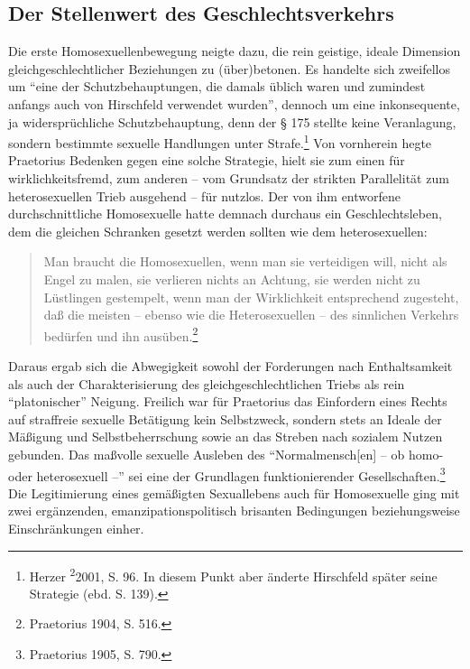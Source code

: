 \documentclass[a4paper,
fontsize=11pt,
oneside,
numbers=noperiodatend,
parskip=half-,
bibliography=totoc,
final
]{scrartcl}
\begin{document}
\subsection*{Der Stellenwert des
Geschlechtsverkehrs}\label{der-stellenwert-des-geschlechtsverkehrs}

Die erste Homosexuellenbewegung neigte dazu, die rein geistige, ideale
Dimension gleichgeschlechtlicher Beziehungen zu (über)betonen. Es
handelte sich zweifellos um \enquote{eine der Schutzbehauptungen, die
damals üblich waren und zumindest anfangs auch von Hirschfeld verwendet
wurden}, dennoch um eine inkonsequente, ja widersprüchliche
Schutzbehauptung, denn der § 175 stellte keine Veranlagung, sondern
bestimmte sexuelle Handlungen unter Strafe.\footnote{Herzer
  \textsuperscript{2}2001, S. 96. In diesem Punkt aber änderte
  Hirschfeld später seine Strategie (ebd. S. 139).} Von vornherein hegte
Praetorius Bedenken gegen eine solche Strategie, hielt sie zum einen für
wirklichkeitsfremd, zum anderen -- vom Grundsatz der strikten
Parallelität zum heterosexuellen Trieb ausgehend -- für nutzlos. Der von
ihm entworfene durchschnittliche Homosexuelle hatte demnach durchaus ein
Geschlechtsleben, dem die gleichen Schranken gesetzt werden sollten wie
dem heterosexuellen:

\begin{quote}
Man braucht die Homosexuellen, wenn man sie verteidigen will, nicht als
Engel zu malen, sie verlieren nichts an Achtung, sie werden nicht zu
Lüstlingen gestempelt, wenn man der Wirklichkeit entsprechend zugesteht,
daß die meisten -- ebenso wie die Heterosexuellen -- des sinnlichen
Verkehrs bedürfen und ihn ausüben.\footnote{Praetorius 1904, S. 516.}
\end{quote}

Daraus ergab sich die Abwegigkeit sowohl der Forderungen nach
Enthaltsamkeit als auch der Charakterisierung des gleichgeschlechtlichen
Triebs als rein \enquote{platonischer} Neigung. Freilich war für
Praetorius das Einfordern eines Rechts auf straffreie sexuelle
Betätigung kein Selbstzweck, sondern stets an Ideale der Mäßigung und
Selbstbeherrschung sowie an das Streben nach sozialem Nutzen gebunden.
Das maßvolle sexuelle Ausleben des \enquote{Normalmensch{[}en{]} -- ob
homo- oder heterosexuell --} sei eine der Grundlagen funktionierender
Gesellschaften.\footnote{Praetorius 1905, S. 790.} Die Legitimierung
eines gemäßigten Sexuallebens auch für Homosexuelle ging mit zwei
ergänzenden, emanzipationspolitisch brisanten Bedingungen
beziehungsweise Einschränkungen einher.
\end{document}
